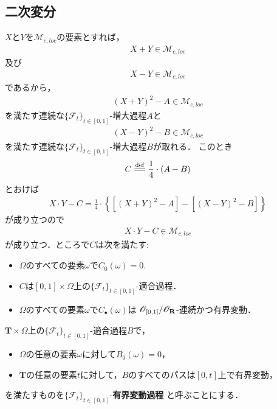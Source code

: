 \subsection{二次変分}
	$X$と$Y$を$\mathscr{M}_{c,loc}$の要素とすれば，
	\begin{align}
		X + Y \in \mathscr{M}_{c,loc}
	\end{align}
	及び
	\begin{align}
		X - Y \in \mathscr{M}_{c,loc}
	\end{align}
	であるから，
	\begin{align}
		(X + Y)^{2} - A \in \mathscr{M}_{c,loc}
	\end{align}
	を満たす連続な$\{\mathscr{F}_t\}_{t \in [0,1]}$-増大過程$A$と
	\begin{align}
		(X - Y)^{2} - B \in \mathscr{M}_{c,loc}
	\end{align}
	を満たす連続な$\{\mathscr{F}_t\}_{t \in [0,1]}$-増大過程$B$が取れる．
	このとき
	\begin{align}
		C \defeq \frac{1}{4} \cdot (A - B)
	\end{align}
	とおけば
	\begin{align}
		X \cdot Y - C = \frac{1}{4} \cdot 
		\left\{ \left[(X + Y)^{2} - A\right] - \left[(X - Y)^{2} - B\right] \right\}
	\end{align}
	が成り立つので
	\begin{align}
		X \cdot Y - C \in \mathscr{M}_{c,loc}
	\end{align}
	が成り立つ．ところで$C$は次を満たす:
	\begin{itemize}
		\item $\Omega$のすべての要素$\omega$で$C_{0}(\omega) = 0$.
		\item $C$は$[0,1] \times \Omega$上の$\{\mathscr{F}_{t}\}_{t \in [0,1]}$-適合過程．
		\item $\Omega$のすべての要素$\omega$で$C_{\bullet}(\omega)$は
			$\mathscr{O}_{[0,1]}/\mathscr{O}_{\mathbf{R}}$-連続かつ有界変動．
	\end{itemize}
	
	\begin{screen}
		\begin{dfn}[有界変動過程]
			$\mathbf{T} \times \Omega$上の$\{\mathscr{F}_{t}\}_{t \in [0,1]}$-適合過程$B$で，
			\begin{itemize}
				\item $\Omega$の任意の要素$\omega$に対して$B_0(\omega) = 0$，
				\item $\mathbf{T}$の任意の要素$t$に対して，$B$のすべてのパスは$[0,t]$上で有界変動，
			\end{itemize}
			を満たすものを$\{\mathscr{F}_{t}\}_{t \in [0,1]}$-{\bf 有界変動過程}
			と呼ぶことにする．
		\end{dfn}
	\end{screen}
	
